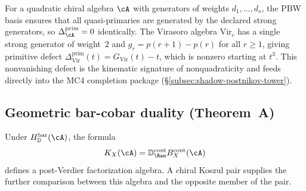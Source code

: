 \begin{remark}
\label{rem:primitive-defect-probe}

For a quadratic chiral algebra $\cA$ with generators of
weights $d_1, \ldots, d_s$, the PBW basis ensures that all
quasi-primaries are generated by the declared strong generators,
so $\Delta^{\mathrm{prim}}_\cA = 0$ identically. The
Virasoro algebra $\mathrm{Vir}_c$ has a single strong generator
of weight~$2$ and $g_r = p(r+1) - p(r)$ for all $r \geq 1$,
giving primitive defect $\Delta^{\mathrm{prim}}_{\mathrm{Vir}}(t)
= G_{\mathrm{Vir}}(t) - t$, which is nonzero starting at
$t^3$. This nonvanishing defect is the kinematic signature of
nonquadraticity and feeds directly into the MC4 completion
package
(\S\textup{\ref{subsec:shadow-postnikov-tower}}).
\end{remark}

\subsection{Geometric bar-cobar duality (Theorem~A)}
\label{sec:theorem-a-statement}

Under $H_{\mathbb D}^{\mathrm{bar}}(\cA)$, the formula
\[
K_X(\cA)=\mathbb D_{\Ran}^{\mathrm{cont}}B_X^{\mathrm{cont}}(\cA)
\]
defines a post-Verdier factorization algebra.  A chiral Koszul pair
supplies the further comparison between this algebra and the opposite
member of the pair.

